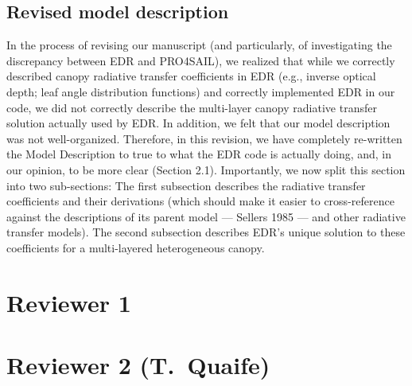 \documentclass{article}
\begin{document}
\subsection{Revised model description}\label{subsec:model}

In the process of revising our manuscript (and particularly, of investigating the discrepancy between EDR and PRO4SAIL), we realized that while we correctly described canopy radiative transfer coefficients in EDR (e.g., inverse optical depth; leaf angle distribution functions) and correctly implemented EDR in our code,
we did not correctly describe the multi-layer canopy radiative transfer solution actually used by EDR.\@
In addition, we felt that our model description was not well-organized.
Therefore, in this revision, we have completely re-written the Model Description to true to what the EDR code is actually doing, and, in our opinion, to be more clear (Section 2.1).
Importantly, we now split this section into two sub-sections:
The first subsection describes the radiative transfer coefficients and their derivations (which should make it easier to cross-reference against the descriptions of its parent model --- Sellers 1985 --- and other radiative transfer models).
The second subsection describes EDR's unique solution to these coefficients for a multi-layered heterogeneous canopy.

\section{Reviewer 1}\label{sec:r1}



\section{Reviewer 2 (T.\ Quaife)}\label{sec:r2}




\end{document}
